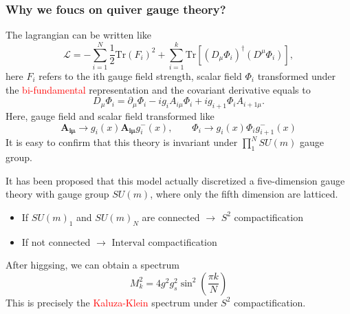 \documentclass{beamer}
\begin{document}
\begin{frame}
    \frametitle{Why we foucs on quiver gauge theory?}
    The lagrangian can be written like
    \begin{equation*}
        \mathcal{L}=-\sum_{i=1}^{N}\frac{1}{2}\mathrm{Tr}(F_i)^2+\sum_{i=1}^{k}\mathrm{Tr}[(D_\mu\Phi_i)^\dagger(D^\mu\Phi_i)],
    \end{equation*}
    here $F_i$ refers to the ith gauge field strength, scalar field $\Phi_i$ transformed under the \textcolor{red}{bi-fundamental} representation and the covariant derivative equals to
    \begin{equation*}
        D_\mu \Phi_i=\partial_\mu \Phi_i -ig_iA_{i\mu}\Phi_i+ig_{i+1}\Phi_i A_{i+1\mu}.
    \end{equation*}
    Here, gauge field and scalar field transformed like
    \begin{equation*}
        \bm{A_{i\mu}}\rightarrow g_i(x) \bm{A_{i\mu}} g_i^-(x),\qquad \Phi_i\rightarrow g_i(x)\Phi_i g_{i+1}^-(x)
    \end{equation*}
    It is easy to confirm that this theory is invariant under $\prod_1^N SU(m)$ gauge group.
\end{frame}
\begin{frame}
    It has been proposed that this model actually discretized a five-dimension gauge theory with gauge group $SU(m)$, where 
    only the fifth dimension are latticed.
    \begin{itemize}
        \item If $SU(m)_1$ and $SU(m)_N$ are connected $\longrightarrow$ $S^2$ compactification
        \item If not connected $\longrightarrow$ $\mathrm{Interval}$ compactification
    \end{itemize}
    After higgsing, we can obtain a spectrum
    \begin{equation*}
        M_k^2=4g^2g_s^2\sin^2\left(\frac{\pi k}{N}\right)
    \end{equation*}
    This is precisely the \textcolor{red}{Kaluza-Klein} spectrum under $S^2$ compactification.
\end{frame}
\end{document}
